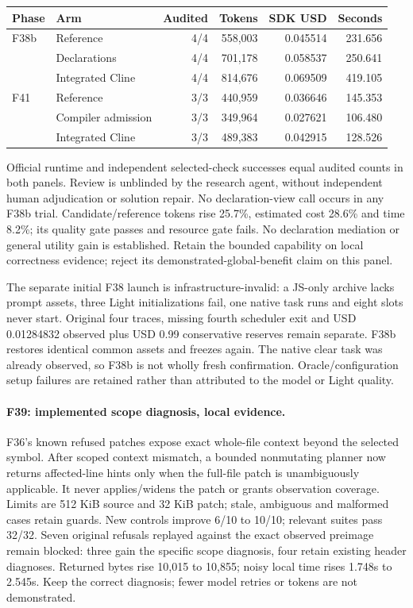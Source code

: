 \documentclass[11pt,a4paper]{article}
\begin{document}
\begin{center}\small
\begin{tabular}{@{}llrrrr@{}}
\toprule Phase & Arm & Audited & Tokens & SDK USD & Seconds \\\midrule
F38b & Reference & 4/4 & 558,003 & 0.045514 & 231.656 \\
 & Declarations & 4/4 & 701,178 & 0.058537 & 250.641 \\
 & Integrated Cline & 4/4 & 814,676 & 0.069509 & 419.105 \\\midrule
F41 & Reference & 3/3 & 440,959 & 0.036646 & 145.353 \\
 & Compiler admission & 3/3 & 349,964 & 0.027621 & 106.480 \\
 & Integrated Cline & 3/3 & 489,383 & 0.042915 & 128.526 \\
\bottomrule
\end{tabular}\end{center}

Official runtime and independent selected-check successes equal audited counts
in both panels. Review is unblinded by the research agent, without independent
human adjudication or solution repair. No declaration-view call occurs in any
F38b trial. Candidate/reference tokens rise 25.7\%, estimated cost 28.6\% and time
8.2\%; its quality gate passes and resource gate fails. No declaration mediation
or general utility gain is established. Retain the bounded capability on local
correctness evidence; reject its demonstrated-global-benefit claim on this panel.

The separate initial F38 launch is infrastructure-invalid: a JS-only archive
lacks prompt assets, three Light initializations fail, one native task runs and
eight slots never start. Original four traces, missing fourth scheduler exit and
USD 0.01284832 observed plus USD 0.99 conservative reserves remain separate.
F38b restores identical common assets and freezes again. The native clear task
was already observed, so F38b is not wholly fresh confirmation. Oracle/configuration
setup failures are retained rather than attributed to the model or Light quality.

\paragraph{F39: implemented scope diagnosis, local evidence.}
F36's known refused patches expose exact whole-file context beyond the selected
symbol. After scoped context mismatch, a bounded nonmutating planner now returns
affected-line hints only when the full-file patch is unambiguously applicable.
It never applies/widens the patch or grants observation coverage. Limits are
512 KiB source and 32 KiB patch; stale, ambiguous and malformed cases retain guards.
New controls improve 6/10 to 10/10; relevant suites pass 32/32. Seven original
refusals replayed against the exact observed preimage remain blocked: three gain
the specific scope diagnosis, four retain existing header diagnoses. Returned
bytes rise 10,015 to 10,855; noisy local time rises 1.748s to 2.545s. Keep the
correct diagnosis; fewer model retries or tokens are not demonstrated.
\end{document}

